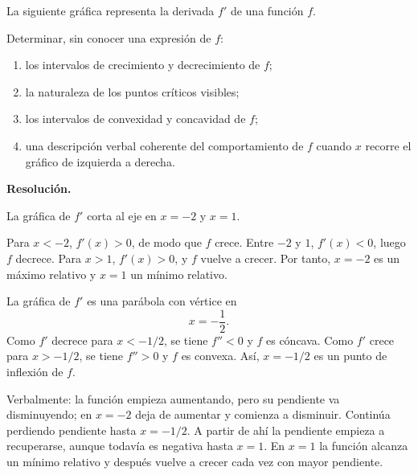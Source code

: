 \begin{solvedexercise}
La siguiente gráfica representa la derivada $f'$ de una función $f$.

\begin{center}
\end{center}

Determinar, sin conocer una expresión de $f$:
\begin{enumerate}[label=\alph*)]
\item los intervalos de crecimiento y decrecimiento de $f$;
\item la naturaleza de los puntos críticos visibles;
\item los intervalos de convexidad y concavidad de $f$;
\item una descripción verbal coherente del comportamiento de $f$ cuando $x$ recorre el gráfico de izquierda a derecha.
\end{enumerate}
\tcblower
\textbf{Resolución.}\par\smallskip
La gráfica de $f'$ corta al eje en $x=-2$ y $x=1$.

Para $x<-2$, $f'(x)>0$, de modo que $f$ crece. Entre $-2$ y $1$, $f'(x)<0$, luego $f$ decrece. Para $x>1$, $f'(x)>0$, y $f$ vuelve a crecer. Por tanto, $x=-2$ es un máximo relativo y $x=1$ un mínimo relativo.

La gráfica de $f'$ es una parábola con vértice en
\[
x=-\frac12.
\]
Como $f'$ decrece para $x<-1/2$, se tiene $f''<0$ y $f$ es cóncava. Como $f'$ crece para $x>-1/2$, se tiene $f''>0$ y $f$ es convexa. Así, $x=-1/2$ es un punto de inflexión de $f$.

Verbalmente: la función empieza aumentando, pero su pendiente va disminuyendo; en $x=-2$ deja de aumentar y comienza a disminuir. Continúa perdiendo pendiente hasta $x=-1/2$. A partir de ahí la pendiente empieza a recuperarse, aunque todavía es negativa hasta $x=1$. En $x=1$ la función alcanza un mínimo relativo y después vuelve a crecer cada vez con mayor pendiente.
\end{solvedexercise}

